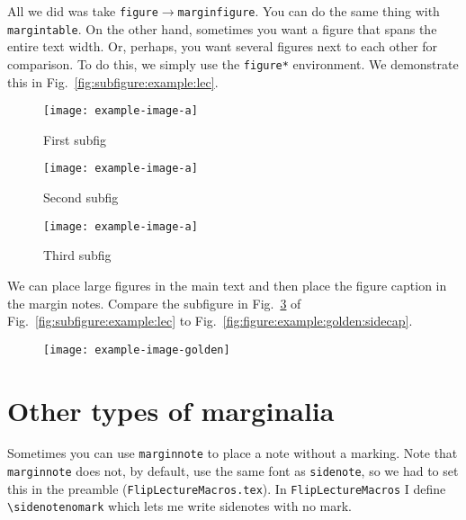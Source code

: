 All we did was take \texttt{figure}$\rightarrow$\texttt{marginfigure}. You can do the same thing with \texttt{margintable}. On the other hand, sometimes you want a figure that spans the entire text width. Or, perhaps, you want several figures next to each other for comparison. To do this, we simply use the \texttt{figure*} environment. We demonstrate this in Fig.~\ref{fig:subfigure:example:lec}.
\begin{figure*}%
    \centering
    \begin{subfigure}{0.3\linewidth}
    \centering
        \texttt{[image: example-image-a]}
        \caption{First subfig}
        \label{fig:subfig:1:lec}
    \end{subfigure}\;%
    \begin{subfigure}{0.3\linewidth}
    \centering
        \texttt{[image: example-image-a]}
        \caption{Second subfig}
        \label{fig:subfig:2:lec}
    \end{subfigure}\;%
    \begin{subfigure}{0.3\linewidth}
    \centering
        \texttt{[image: example-image-a]}
        \caption{Third subfig}
        \label{fig:subfig:3:lec}
    \end{subfigure}%
    \caption{Here's how to spread a figure across the entire page, not just the main text width.}
    \label{fig:subfigure:example:lec}
\end{figure*}


We can place large figures in the main text and then place the figure caption in the margin notes. Compare the subfigure in Fig.~\ref{fig:subfig:3:lec} of Fig.~\ref{fig:subfigure:example:lec} to Fig.~\ref{fig:figure:example:golden:sidecap}.
\begin{figure}%
    \texttt{[image: example-image-golden]}
\end{figure}


\section{Other types of marginalia}

Sometimes you can use \texttt{marginnote} to place a note without a marking.%
Note that \texttt{marginnote} does not, by default, use the same font as \texttt{sidenote}, so we had to set this in the preamble (\texttt{FlipLectureMacros.tex}). In \texttt{FlipLectureMacros} I define \verb!\sidenotenomark! which lets me write sidenotes with no mark.


